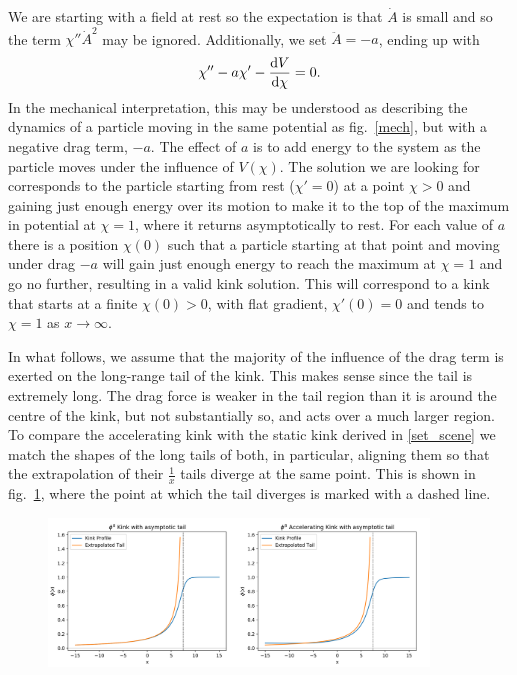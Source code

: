 \documentclass[11pt, oneside,titlepage]{article}  	%
\numberwithin{equation}{section}
\newcommand{\drv}{\ensuremath{\textup{d}}}
\begin{document}
 We are starting with a field at rest so the expectation is that $\dot{A}$ is small and so the term $\chi '' \dot{A}^2$ may be ignored. Additionally, we set $\ddot{A} = -a$, ending up with
 \begin{equation} \label{acc_kink}
 \chi'' - a\chi' - \frac{\drv V }{\drv \chi}=0.
 \end{equation}
In the mechanical interpretation, this may be understood as describing the dynamics of a particle moving in the same potential as fig.~\ref{mech}, but with a negative drag term, $-a$. The effect of $a$ is to add energy to the system as the particle moves under the influence of $V(\chi)$. The solution we are looking for corresponds to the particle starting from rest ($\chi' = 0$) at a point $\chi >0$ and gaining just enough energy over its motion to make it to the top of the maximum in potential at $\chi=1$, where it returns asymptotically to rest. For each value of $a$ there is a position $\chi(0)$ such that a particle starting at that point and moving under drag $-a$ will gain just enough energy to reach the maximum at $\chi=1$ and go no further, resulting in a valid kink solution. This will correspond to a kink that starts at a finite $\chi(0)>0$, with flat gradient, $\chi'(0)=0$ and tends to $\chi=1$ as $x \rightarrow \infty$.\par
In what follows, we assume that the majority of the influence of the drag term is exerted on the long-range tail of the kink. This makes sense since the tail is extremely long. The drag force is weaker in the tail region than it is around the centre of the kink, but not substantially so, and acts over a much larger region. To compare the accelerating kink with the static kink derived in \textsection \ref{set_scene} we match the shapes of the long tails of both, in particular, aligning them so that the extrapolation of their $\frac{1}{x}$ tails diverge at the same point. This is shown in fig.~\ref{tails}, where the point at which the tail diverges is marked with a dashed line.\par
\begin{figure}
\centering
\includegraphics[width=0.9\textwidth]{asym_tails.png}
 \label{tails}
\end{figure}
\end{document}

